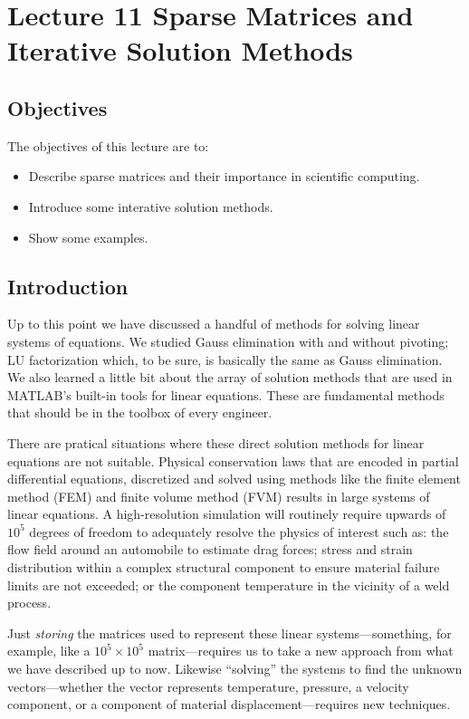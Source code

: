 \chapter{Lecture 11 Sparse Matrices and Iterative Solution Methods}
\label{ch:lec11n}
\section{Objectives}
The objectives of this lecture are to:
\begin{itemize}
\item Describe sparse matrices and their importance in scientific computing.
\item Introduce some interative solution methods.
\item Show some examples.
\end{itemize}
\setcounter{lstannotation}{0}

\section{Introduction}
Up to this point we have discussed a handful of methods for solving linear systems of equations.  We studied Gauss elimination with and without pivoting; LU factorization which, to be sure, is basically the same as Gauss elimination.  We also learned a little bit about the array of solution methods that are used in MATLAB's built-in tools for linear equations.  These are fundamental methods that should be in the toolbox of every engineer.

There are pratical situations where these direct solution methods for linear equations are not suitable.  Physical conservation laws that are encoded in partial differential equations, discretized and solved using methods like the finite element method (FEM) and finite volume method (FVM) results in large systems of linear equations.  A high-resolution simulation will routinely require upwards of $10^5$ degrees of freedom to adequately resolve the physics of interest such as: the flow field around an automobile to estimate drag forces; stress and strain distribution within a complex structural component to ensure material failure limits are not exceeded; or the component temperature in the vicinity of a weld process.

Just \emph{storing} the matrices used to represent these linear systems---something, for example, like a $10^5 \times 10^5$ matrix---requires us to take a new approach from what we have described up to now.  Likewise ``solving'' the systems to find the unknown vectors---whether the vector represents temperature, pressure, a velocity component, or a component of material displacement---requires new techniques.

